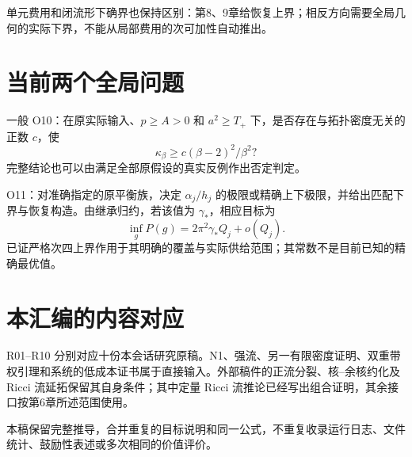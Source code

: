 \documentclass[UTF8,11pt,openany,oneside,fontset=none]{ctexbook}
\begin{document}
单元费用和闭流形下确界也保持区别：第8、9章给恢复上界；相反方向需要全局几何的实际下界，不能从局部费用的次可加性自动推出。

\section{当前两个全局问题}\label{ch11:ux5f53ux524dux4e24ux4e2aux5168ux5c40ux95eeux9898}

一般 O10：在原实际输入、\(p\ge A>0\) 和 \(a^2\ge T_+\) 下，是否存在与拓扑密度无关的正数 \(c\)，使 \[
\kappa_\beta\ge c(\beta-2)^2/\beta^2?
\] 完整结论也可以由满足全部原假设的真实反例作出否定判定。

O11：对准确指定的原平衡族，决定 \(\alpha_j/h_j\) 的极限或精确上下极限，并给出匹配下界与恢复构造。由继承归约，若该值为 \(\gamma_*\)，相应目标为 \[
\inf_gP(g)=2\pi^2\gamma_*Q_j+o(Q_j).
\] 已证严格次四上界作用于其明确的覆盖与实际供给范围；其常数不是目前已知的精确最优值。

\section{本汇编的内容对应}\label{ch11:ux672cux6c47ux7f16ux7684ux5185ux5bb9ux5bf9ux5e94}

R01--R10 分别对应十份本会话研究原稿。N1、强流、另一有限密度证明、双重带权引理和系统的低成本证书属于直接输入。外部稿件的正流分裂、核--余核约化及 Ricci 流延拓保留其自身条件；其中定量 Ricci 流推论已经写出组合证明，其余接口按第6章所述范围使用。

本稿保留完整推导，合并重复的目标说明和同一公式，不重复收录运行日志、文件统计、鼓励性表述或多次相同的价值评价。
\end{document}
